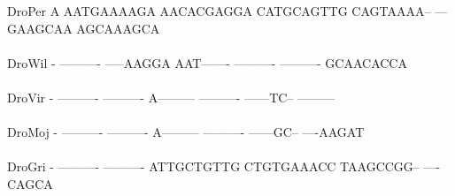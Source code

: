 \documentclass[11pt,twoside,reqno,a4paper]{article}
\begin{document}
{DroPer	A	AATGAAAAGA	AACACGAGGA	CATGCAGTTG	CAGTAAAA--	---GAAGCAA	AGCAAAGCA\\
\hspace*{7\charwidth}\hspace*{1\charwidth}\hspace*{1\charwidth}\hspace*{1\charwidth}\hspace*{1\charwidth}\hspace*{1\charwidth}\hspace*{1\charwidth}\\
DroWil	-	----------	-----AAGGA	AAT-------	----------	----------	GCAACACCA\\
\hspace*{7\charwidth}\hspace*{1\charwidth}\hspace*{1\charwidth}\hspace*{1\charwidth}\hspace*{1\charwidth}\hspace*{1\charwidth}\hspace*{1\charwidth}\\
DroVir	-	----------	----------	A---------	----------	------TC--	---------\\
\hspace*{7\charwidth}\hspace*{1\charwidth}\hspace*{1\charwidth}\hspace*{1\charwidth}\hspace*{1\charwidth}\hspace*{1\charwidth}\hspace*{1\charwidth}\\
DroMoj	-	----------	----------	A---------	----------	------GC--	----AAGAT\\
\hspace*{7\charwidth}\hspace*{1\charwidth}\hspace*{1\charwidth}\hspace*{1\charwidth}\hspace*{1\charwidth}\hspace*{1\charwidth}\hspace*{1\charwidth}\\
DroGri	-	----------	----------	ATTGCTGTTG	CTGTGAAACC	TAAGCCGG--	----CAGCA\\
\hspace*{7\charwidth}\hspace*{1\charwidth}\hspace*{1\charwidth}\hspace*{1\charwidth}\hspace*{1\charwidth}\hspace*{1\charwidth}\hspace*{1\charwidth}\\
}
\end{document}
